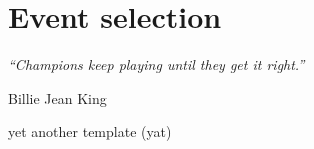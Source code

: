 \chapter{Event selection}
\label{ch:evt_selection}
\epigraph{\emph{“Champions keep playing until they get it right.”}}{Billie Jean King}

yet another template (yat)